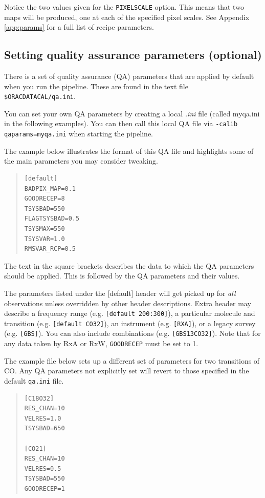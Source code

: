 \documentclass[twoside,11pt]{article}
\renewcommand{\_}{\texttt{\symbol{95}}}
\newcommand{\param}[1]{\texttt{#1}}
\begin{document}
Notice the two values given for the  \param{PIXEL\_SCALE} option. This means that two maps will be produced, one at each of the specified pixel scales. See Appendix \ref{app:params} for a full list of recipe parameters.


\subsection{Setting quality assurance parameters (optional)}
\label{sec:qa}
There is a set of quality assurance (QA) parameters that are applied by default when you run the pipeline. These are found in the text file \param{\$ORAC\_DATA\_CAL/qa.ini}.

You can set your own QA parameters by creating a local \textit{.ini} file (called myqa.ini in the following examples). You can then call this local QA file via \param{-calib qaparams=myqa.ini} when starting the pipeline. 

The example below illustrates the format of this QA file and highlights some of the main parameters you may consider tweaking.

\vspace{0.2cm}
\begin{quote}
\begin{verbatim}
[default]
BADPIX_MAP=0.1
GOODRECEP=8
TSYSBAD=550
FLAGTSYSBAD=0.5
TSYSMAX=550
TSYSVAR=1.0
RMSVAR_RCP=0.5
 \end{verbatim}
\end{quote}
The text in the square brackets describes the data to which the QA parameters should be applied. This is followed by the QA parameters and their values.

The parameters listed under the [default] header will get picked up for \textit{all} observations unless overridden by other header descriptions. Extra header may describe a frequency range (e.g. \texttt{[default 200:300]}), a particular molecule and transition (e.g. \texttt{[default CO32]}), an instrument  (e.g. \texttt{[RXA]}), or a legacy survey (e.g. \texttt{[GBS]}). You can also include combinations (e.g. \texttt{[GBS\_13CO32]}). Note that for any data taken by RxA or RxW, \param{GOODRECEP} must be set to 1.

The example file below sets up a different set of parameters for two transitions of CO. Any QA parameters not explicitly set will revert to those specified in the default \texttt{qa.ini} file.

\begin{center}
\vspace{0.2cm}
\begin{quote}
\begin{verbatim}
[C18O32]
RES_CHAN=10
VELRES=1.0
TSYSBAD=650

[CO21]
RES_CHAN=10
VELRES=0.5
TSYSBAD=550
GOODRECEP=1
\end{verbatim}
\end{quote}
\end{center}
\end{document}
